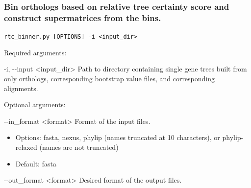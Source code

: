 \documentclass{article}
\def\code#1{\texttt{#1}}
\begin{document}
        \subsubsection{Bin orthologs based on relative tree certainty score and construct supermatrices from the bins.}
        \begin{description}
        
            \vspace{0.2cm}
            \item \code{rtc\_binner.py [OPTIONS] -i <input\_dir>}
            \vspace{0.2cm}
            
            \begin{description}
                \item Required arguments:
                \begin{description}
                    \item -i, -\/-input \hspace{0.2cm} <input\_dir> \hspace{0.2cm} Path to directory containing single gene trees built from only orthologs, corresponding bootstrap value files, and corresponding alignments. 
                \end{description}
            \end{description}
            \vspace{0.2cm}
            \begin{description}
                \item Optional arguments:
                \begin{description}
                    \item -\/-in\_format \hspace{0.2cm} <format> \hspace{0.2cm} Format of the input files.
                    \begin{itemize}
                        \item Options: fasta, nexus, phylip (names truncated at 10 characters), or phylip-relaxed (names are not truncated)
                        \item Default: fasta
                    \end{itemize}
                    \item -\/-out\_format \hspace{0.2cm} <format> \hspace{0.2cm} Desired format of the output files.
                    \begin{itemize}

\end{itemize}
\end{description}
\end{description}
\end{description}
\end{document}
